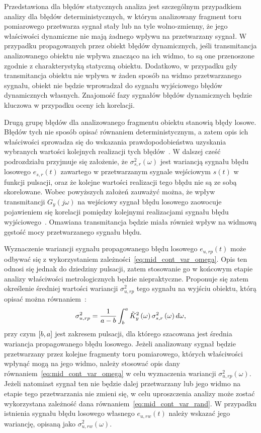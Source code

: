 Przedstawiona dla błędów statycznych analiza jest szczególnym przypadkiem analizy dla błędów deterministycznych, w którym analizowany fragment toru pomiarowego przetwarza sygnał stały lub na tyle wolno-zmienny, że jego właściwości dynamiczne nie mają żadnego wpływu na przetwarzany sygnał. W przypadku propagowanych przez obiekt błędów dynamicznych, jeśli transmitancja analizowanego obiektu nie wpływa znacząco na ich widmo, to są one przenoszone zgodnie z charakterystyką statyczną obiektu. Dodatkowo, w przypadku gdy transmitancja obiektu nie wpływa w żaden sposób na widmo przetwarzanego sygnału, obiekt nie będzie wprowadzał do sygnału wyjściowego błędów dynamicznych własnych. Znajomość fazy sygnałów błędów dynamicznych będzie kluczowa w przypadku oceny ich korelacji.

Drugą grupę błędów dla analizowanego fragmentu obiektu stanowią błędy losowe. Błędów tych nie sposób opisać równaniem deterministycznym, a zatem opis ich właściwości sprowadza się do wskazania prawdopodobieństwa uzyskania wybranych wartości kolejnych realizacji tych błędów~\cite{jcgm_guide, jakubiec_system}. W dalszej cześć podrozdziału przyjmuje się założenie, że $\sigma_{s,r}^{2}(\omega)$ jest wariancją sygnału błędu losowego $e_{s,r}(t)$ zawartego w przetwarzanym sygnale wejściowym $s(t)$ w funkcji pulsacji, oraz że kolejne wartości realizacji tego błędu nie są ze sobą skorelowane. Wobec powyższych założeń zauważyć można, że wpływ transmitancji $G_{y}(j\omega)$ na wejściowy sygnał błędu losowego zaowocuje pojawieniem się korelacji pomiędzy kolejnymi realizacjami sygnału błędu wyjściowego~\cite{jadziak_dsp, bibbona_filter, benassi_filter}. Omawiana transmitancja będzie miała również wpływ na widmową gęstość mocy przetwarzanego sygnału błędu.

Wyznaczenie wariancji sygnału propagowanego błędu losowego $e_{u,rp}(t)$ może odbywać się z wykorzystaniem zależności~\eqref{eq:mid_cont_var_omega}. Opis ten odnosi się jednak do dziedziny pulsacji, zatem stosowanie go w końcowym etapie analizy właściwości metrologicznych będzie niepraktyczne. Proponuje się zatem określenie średniej wartości wariancji $\sigma_{u,rp}^{2}$ tego sygnału na wyjściu obiektu, którą opisać można równaniem~\cite{jadziak_dsp, proakis_dsp}:
\begin{equation}
\sigma_{u,rp}^{2} = \frac{1}{a - b} \int _{b} ^{a} \tilde{K}_{y}^{2} \left(\omega\right) \sigma_{s,r}^{2} \left(\omega\right) d\omega \label{eq:mid_cont_var_rand},
\end{equation}
przy czym $\interval{b}{a}$ jest zakresem pulsacji, dla którego szacowana jest średnia wariancja propagowanego błędu losowego. Jeżeli analizowany sygnał będzie przetwarzany przez kolejne fragmenty toru pomiarowego, których właściwości wpłynąć mogą na jego widmo, należy stosować opis dany równaniem~\eqref{eq:mid_cont_var_omega} w celu wyznaczenia wariancji $\sigma_{u,rp}^{2}(\omega)$. Jeżeli natomiast sygnał ten nie będzie dalej przetwarzany lub jego widmo na etapie tego przetwarzania nie zmieni się, w celu uproszczenia analizy może zostać wykorzystana zależność dana równaniem~\eqref{eq:mid_cont_var_rand}. W przypadku istnienia sygnału błędu losowego własnego $e_{u,rw}(t)$ należy wskazać jego wariancję, opisaną jako $\sigma_{u,rw}^{2}(\omega)$.

